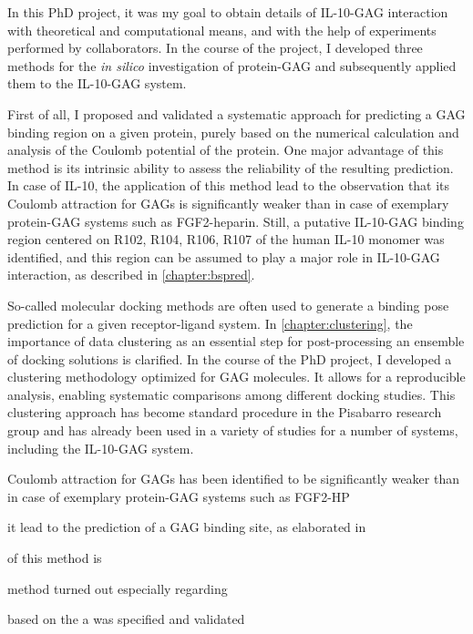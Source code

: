 In this PhD project, it was my goal to obtain details of IL-10-GAG interaction
with theoretical and computational means, and with the help of experiments
performed by collaborators. In the course of the project, I developed three
methods for the \textit{in silico} investigation of protein-GAG and subsequently
applied them to the IL-10-GAG system.

First of all, I proposed and validated a systematic approach for predicting a
GAG binding region on a given protein, purely based on the numerical calculation
and analysis of the Coulomb potential of the protein. One major advantage of
this method is its intrinsic ability to assess the reliability of the resulting
prediction. In case of IL-10, the application of this method lead to the
observation that its Coulomb attraction for GAGs is significantly weaker than in
case of exemplary protein-GAG systems such as FGF2-heparin. Still, a putative
IL-10-GAG binding region centered on R102, R104, R106, R107 of the human IL-10
monomer was identified, and this region can be assumed to play a major role in
IL-10-GAG interaction, as described in \cref{chapter:bspred}.

So-called molecular docking methods are often used to generate a binding pose
prediction for a given receptor-ligand system. In \cref{chapter:clustering}, the
importance of data clustering as an essential step for post-processing an
ensemble of docking solutions is clarified. In the course of the PhD project, I
developed a clustering methodology optimized for GAG molecules. It allows for a
reproducible analysis, enabling systematic comparisons among different docking
studies. This clustering approach has become standard procedure in the Pisabarro
research group and has already been used in a variety of studies for a number of
systems, including the IL-10-GAG system.






Coulomb attraction for GAGs has been identified to be
significantly weaker than in case of exemplary protein-GAG systems such as
FGF2-HP


it lead to the prediction of a GAG binding site, as elaborated in




of this method is

 method turned out
especially regarding





 based on the a
was specified and validated



